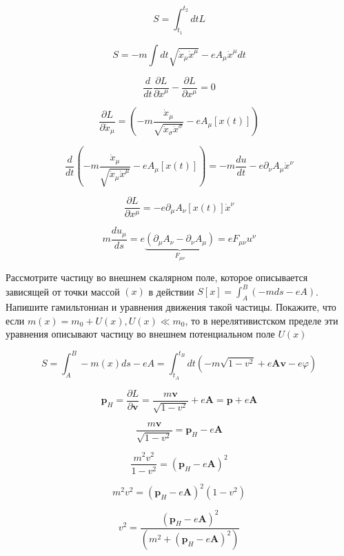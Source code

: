 \begin{solution}
	$$
	S = \int_{t_1}^{t_2}dt  L 
	$$
	
	
	$$
	S = -m \int d t \sqrt{\dot{x}_{\mu} \dot{x}^{\mu}} - e A_{\mu} \dot{x}^{\mu} dt
	$$
	

	$$
	\frac{d}{d t}\frac{\partial L}{\partial \dot{x}^{\mu}} - \frac{\partial L }{\partial x^{\mu}} = 0 
	$$

	$$
	\frac{\partial L}{\partial \dot{x}_{\mu}}= \left(-m \frac{\dot{x}_{\mu}}{\sqrt{\dot{x}_{\sigma} \dot{x}^{\sigma}}} - e A_{\mu}\left[x(t)\right]\right)
	$$

	
	$$
	\frac{d}{d t}\left(-m \frac{\dot{x}_{\mu}}{\sqrt{\dot{x}_{\mu} \dot{x}^{\mu}}} - e A_{\mu}\left[x(t)\right]\right) = -m \frac{d u}{d t} - e \partial_{\nu} A_{\mu}\dot{x}^{\nu}
	$$
	
	$$
	\frac{\partial L }{\partial x^{\mu}} = - e \partial_{\mu} A_{\nu}  \left[x(t)\right] \dot{x}^{\nu}
	$$
	
	$$
	m\frac{d u_{\mu}}{d s} = e \underbrace{\left(\partial_{\mu}A_{\nu} - \partial_{\nu}A_{\mu}\right)}_{F_{\mu \nu}} = e F_{\mu \nu} u^{\nu}
	$$
	
	\begin{problem}
		Рассмотрите частицу во внешнем скалярном поле, которое описывается зависящей от точки
		массой $(x)$ в действии $S\left[x\right] = \int^{B}_{A} \left(- m ds -e A\right)$. Напишите гамильтониан и уравнения движения такой частицы. Покажите, что если $m(x) = m_0+U(x), U(x)\ll m_{0}$, то в нерелятивистском пределе эти уравнения описывают
		частицу во внешнем потенциальном поле $U(x)$
	\end{problem}
	
	\begin{solution}
	$$
	S = \int^{B}_{A} -m(x)ds -e A = \int^{t_B}_{t_A} dt \left(- m \sqrt{1 - v^2} + e\boldsymbol{A}\boldsymbol{v} - e \varphi \right)
	$$
	
	$$
	\boldsymbol{p}_{H} = \frac{\partial L}{\partial \boldsymbol{v}} = \frac{m \boldsymbol{v}}{\sqrt{1-v^2}} + e \boldsymbol{A} = \boldsymbol{p} + e\boldsymbol{A}
	$$
	
	$$
	\frac{m \boldsymbol{v}}{\sqrt{1-v^2}}= \boldsymbol{p}_H-e\boldsymbol{A}
	$$
	
	$$
	\frac{m^2 v^2}{1-v^2}= \left(\boldsymbol{p}_H-e\boldsymbol{A}\right)^2
	$$
	
	$$
	m^2 v^2 =  \left(\boldsymbol{p}_H-e\boldsymbol{A}\right)^2 \left(1-v^2\right)
	$$
	
	$$
	v^2 = \frac{\left(\boldsymbol{p}_H-e\boldsymbol{A}\right)^2 }{\left(m^2 + \left(\boldsymbol{p}_H-e\boldsymbol{A}\right)^2\right)}
	$$
	

\end{solution}
\end{solution}
